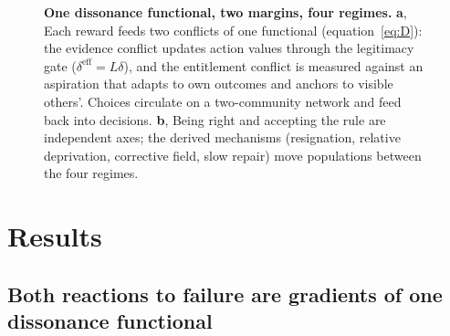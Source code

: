 \documentclass[11pt]{article}
\newcommand{\1}{\mathbf{1}}
\newcommand{\Astar}{A^{*}}
\begin{document}
\begin{figure}[t]
{}%
\caption{\textbf{One dissonance functional, two margins, four regimes.} \textbf{a}, Each reward feeds two conflicts of one functional (equation~\eqref{eq:D}): the evidence conflict updates action values through the legitimacy gate ($\delta^{\mathrm{eff}}=L\delta$), and the entitlement conflict is measured against an aspiration that adapts to own outcomes and anchors to visible others'. Choices circulate on a two-community network and feed back into decisions. \textbf{b}, Being right and accepting the rule are independent axes; the derived mechanisms (resignation, relative deprivation, corrective field, slow repair) move populations between the four regimes.}
\label{fig:mech}
\end{figure}

\section{Results}

\subsection{Both reactions to failure are gradients of one dissonance functional}
\end{document}
